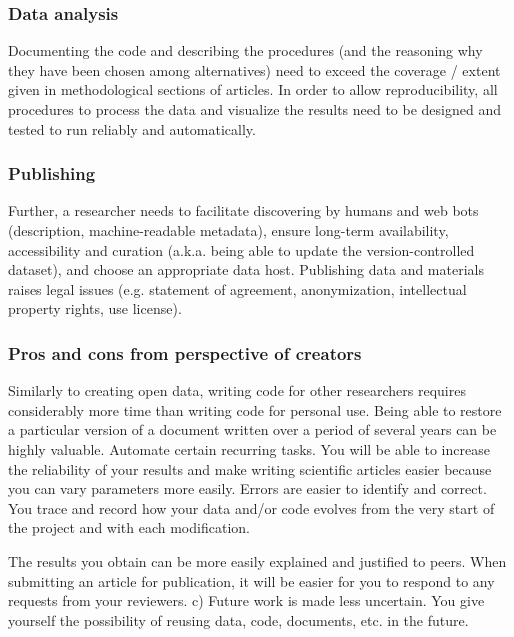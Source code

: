 \subsubsection{Data analysis}
%
Documenting the code and describing the procedures (and the reasoning why they
have been chosen among alternatives) need to exceed the coverage / extent given
in methodological sections of articles.
%
In order to allow reproducibility, all procedures to process the data and
visualize the results need to be designed and tested to run reliably and
automatically.


\subsubsection{Publishing}


Further, a researcher needs to facilitate discovering by humans and web bots
(description, machine-readable metadata), ensure long-term availability,
accessibility and curation  (a.k.a. being able to update the version-controlled
dataset), and choose an appropriate data host.
Publishing data and materials raises legal issues (e.g. statement of agreement,
anonymization, intellectual property rights, use license).



\subsubsection{Pros and cons from perspective of creators}
%
Similarly to creating open data, writing code for other researchers requires
considerably more time than writing code for personal use.
%
Being able to restore a particular version of a document written over a period
of several years can be highly valuable.
%
Automate certain recurring tasks.
%
You will be able to increase the reliability of your results and make writing
scientific articles easier because you can vary parameters more easily.
%
Errors are easier to identify and correct. You trace and record how your data
and/or code evolves from the very start of the project and with each
modification.

%
The results you obtain can be more easily explained and justified to peers.
%
When submitting an article for publication, it will be easier for you to respond
to any requests from your reviewers.
%
c) Future work is made less uncertain.
%
You give yourself the possibility of reusing data, code, documents, etc. in the
future.

